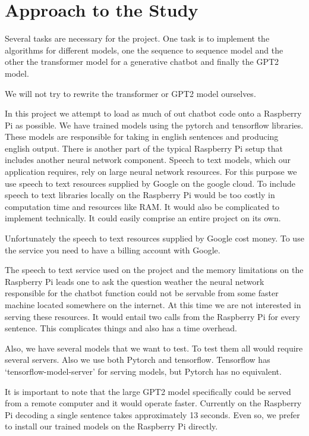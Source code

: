 \section{Approach to the Study}

Several tasks are necessary for the project. One task is to implement
the algorithms for different models, one the sequence to sequence model
and the other the transformer model for a generative chatbot and finally the GPT2 model.

We will not try to rewrite the transformer or GPT2 model ourselves.

In this project we attempt to load as much of out chatbot code onto a Raspberry Pi as possible. We have trained models using the pytorch and tensorflow libraries. These models are responsible for taking in english sentences and producing english output. There is another part of the typical Raspberry Pi setup that includes another neural network component. Speech to text models, which our application requires, rely on large neural network resources. For this purpose we use speech to text resources supplied by Google on the google cloud. To include speech to text libraries locally on the Raspberry Pi would be too costly in computation time and resources like RAM. It would also be complicated to implement technically. It could easily comprise an entire project on its own.

Unfortunately the speech to text resources supplied by Google cost money. To use the service you need to have a billing account with Google.

The speech to text service used on the project and the memory limitations on the Raspberry Pi leads one to ask the question weather the neural network responsible for the chatbot function could not be servable from some faster machine located somewhere on the internet. At this time we are not interested in serving these resources. It would entail two calls from the Raspberry Pi for every sentence. This complicates things and also has a time overhead. 

Also, we have several models that we want to test. To test them all would require several servers. Also we use both Pytorch and tensorflow. Tensorflow has `tensorflow-model-server' for serving models, but Pytorch has no equivalent.

It is important to note that the large GPT2 model specifically could be served from a remote computer and it would operate faster. Currently on the Raspberry Pi decoding a single sentence takes approximately 13 seconds. Even so, we prefer to install our trained models on the Raspberry Pi directly.

